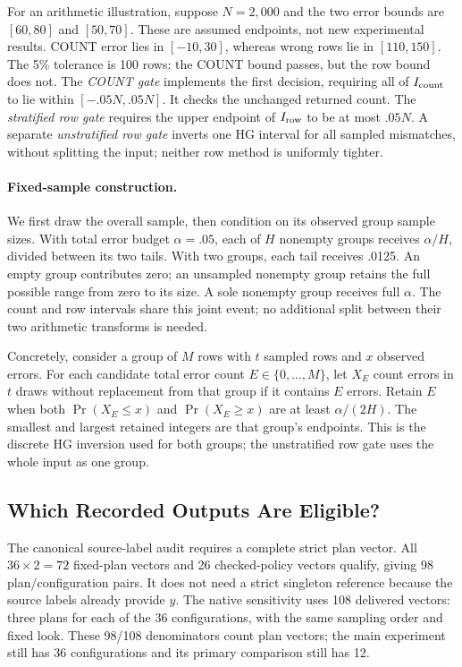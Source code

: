 For an arithmetic illustration, suppose $N=2,000$ and the two error bounds are $[60,80]$ and $[50,70]$. These are assumed endpoints, not new experimental results. COUNT error lies in $[-10,30]$, whereas wrong rows lie in $[110,150]$. The 5\% tolerance is 100 rows: the COUNT bound passes, but the row bound does not. The \emph{COUNT gate} implements the first decision, requiring all of $I_{\rm count}$ to lie within $[-.05N,.05N]$. It checks the unchanged returned count. The \emph{stratified row gate} requires the upper endpoint of $I_{\rm row}$ to be at most $.05N$. A separate \emph{unstratified row gate} inverts one HG interval for all sampled mismatches, without splitting the input; neither row method is uniformly tighter.

\paragraph{Fixed-sample construction.}
We first draw the overall sample, then condition on its observed group sample sizes. With total error budget $\alpha=.05$, each of $H$ nonempty groups receives $\alpha/H$, divided between its two tails. With two groups, each tail receives .0125. An empty group contributes zero; an unsampled nonempty group retains the full possible range from zero to its size. A sole nonempty group receives full $\alpha$. The count and row intervals share this joint event; no additional split between their two arithmetic transforms is needed.

Concretely, consider a group of $M$ rows with $t$ sampled rows and $x$ observed errors. For each candidate total error count $E\in\{0,\ldots,M\}$, let $X_E$ count errors in $t$ draws without replacement from that group if it contains $E$ errors. Retain $E$ when both $\Pr(X_E\le x)$ and $\Pr(X_E\ge x)$ are at least $\alpha/(2H)$. The smallest and largest retained integers are that group's endpoints. This is the discrete HG inversion used for both groups; the unstratified row gate uses the whole input as one group.



\subsection{Which Recorded Outputs Are Eligible?}
The canonical source-label audit requires a complete strict plan vector. All $36\times2=72$ fixed-plan vectors and 26 checked-policy vectors qualify, giving 98 plan/configuration pairs. It does not need a strict singleton reference because the source labels already provide $y$. The native sensitivity uses 108 delivered vectors: three plans for each of the 36 configurations, with the same sampling order and fixed look. These 98/108 denominators count plan vectors; the main experiment still has 36 configurations and its primary comparison still has 12.

